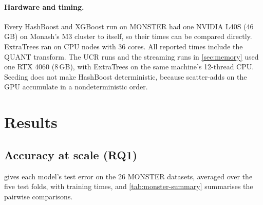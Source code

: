\documentclass[a4paper, 11pt]{article}
\begin{document}
\paragraph{Hardware and timing.}
Every HashBoost and XGBoost run on MONSTER had one NVIDIA L40S (46\,GB) on
Monash's M3 cluster to itself, so their times can be compared directly.
ExtraTrees ran on CPU nodes with 36 cores. All reported times include the
QUANT transform. The UCR runs and the streaming runs in \cref{sec:memory}
used one RTX 4060 (8\,GB), with ExtraTrees on the same machine's 12-thread
CPU. Seeding does not make HashBoost deterministic, because scatter-adds on
the GPU accumulate in a nondeterministic order.

\section{Results}

\subsection{Accuracy at scale (RQ1)}
\label{sec:accuracy}

 gives each model's test error on the 26 MONSTER datasets,
averaged over the five test folds, with training times, and
\cref{tab:monster-summary} summarises the pairwise comparisons.
\end{document}
